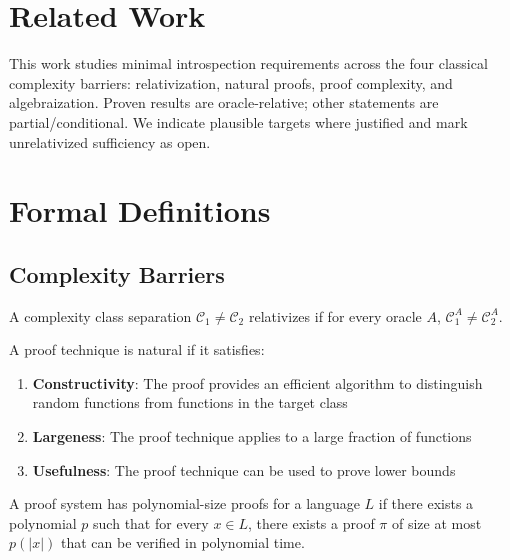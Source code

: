 

\section{Related Work}

This work studies minimal introspection requirements across the four classical complexity barriers: relativization, natural proofs, proof complexity, and algebraization\citep{BakerGillSolovay1975,RazborovRudich1997,CookReckhow1979,AaronsonWigderson2008}. Proven results are oracle-relative; other statements are partial/conditional. We indicate plausible targets where justified and mark unrelativized sufficiency as open.

\section{Formal Definitions}

\subsection{Complexity Barriers}

\begin{definition}
A complexity class separation $\mathcal{C}_1 \neq \mathcal{C}_2$ relativizes if for every oracle $A$, $\mathcal{C}_1^A \neq \mathcal{C}_2^A$\citep{BakerGillSolovay1975}.
\end{definition}

\begin{definition}
A proof technique is natural if it satisfies\citep{RazborovRudich1997}:
\begin{enumerate}
\item \textbf{Constructivity}: The proof provides an efficient algorithm to distinguish random functions from functions in the target class
\item \textbf{Largeness}: The proof technique applies to a large fraction of functions
\item \textbf{Usefulness}: The proof technique can be used to prove lower bounds
\end{enumerate}
\end{definition}

\begin{definition}
A proof system has polynomial-size proofs for a language $L$ if there exists a polynomial $p$ such that for every $x \in L$, there exists a proof $\pi$ of size at most $p(|x|)$ that can be verified in polynomial time\citep{CookReckhow1979}.
\end{definition}

